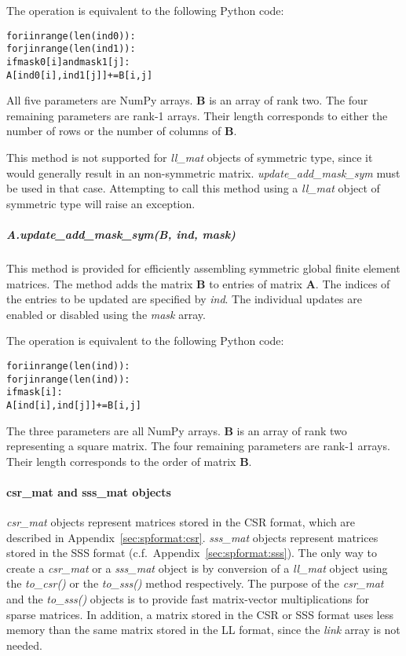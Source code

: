 \documentclass[a4paper]{article}
\newcommand{\mat}[1]{\ensuremath{\boldsymbol{#1}}}
\newlength{\pyindent} \newlength{\pyminipagewidth}
\newenvironment{pyinline}{\begin{trivlist}\item\hspace*{\pyindent}\begin{minipage}{\pyminipagewidth}\small\begin{alltt}}
      {\end{alltt}\end{minipage}\end{trivlist}}
\begin{document}
The operation is equivalent to the following Python code:
\begin{pyinline}
for i in range(len(ind0)):
    for j in range(len(ind1)):
        if mask0[i] and mask1[j]:
            A[ind0[i],ind1[j]] += B[i,j]
\end{pyinline}
%
All five parameters are NumPy arrays. $\mat{B}$ is an array of rank
two. The four remaining parameters are rank-1 arrays. Their length
corresponds to either the number of rows or the number of columns of
$\mat{B}$.

This method is not supported for \textit{ll\_mat} objects of symmetric
type, since it would generally result in an non-symmetric matrix.
\textit{update\_add\_mask\_sym} must be used in that case.  Attempting
to call this method using a \textit{ll\_mat} object of symmetric type
will raise an exception.

\subparagraph{A.update\_add\_mask\_sym(B, ind, mask)}
%
This method is provided for efficiently assembling symmetric global
finite element matrices. The method adds the matrix $\mat{B}$ to
entries of matrix $\mat{A}$. The indices of the entries to be updated
are specified by \textit{ind}. The individual updates are enabled or
disabled using the \textit{mask} array.

The operation is equivalent to the following Python code:
\begin{pyinline}
for i in range(len(ind)):
    for j in range(len(ind)):
        if mask[i]:
            A[ind[i],ind[j]] += B[i,j]
\end{pyinline}
%
The three parameters are all NumPy arrays. $\mat{B}$ is an array of
rank two representing a square matrix. The four remaining parameters
are rank-1 arrays. Their length corresponds to the order of matrix
$\mat{B}$.

\paragraph{csr\_mat and sss\_mat objects}
%
\textit{csr\_mat} objects represent matrices stored in the CSR format,
which are described in Appendix~\ref{sec:spformat:csr}.
\textit{sss\_mat} objects represent matrices stored in the SSS format
(c.f.\ Appendix~\ref{sec:spformat:sss}).  The only way to create a
\textit{csr\_mat} or a \textit{sss\_mat} object is by conversion of a
\textit{ll\_mat} object using the \textit{to\_csr()} or the
\textit{to\_sss()} method respectively. The purpose of the
\textit{csr\_mat} and the \textit{to\_sss()} objects is to provide
fast matrix-vector multiplications for sparse matrices. In addition, a
matrix stored in the CSR or SSS format uses less memory than the same
matrix stored in the LL format, since the \textit{link} array is not
needed.
\end{document}
